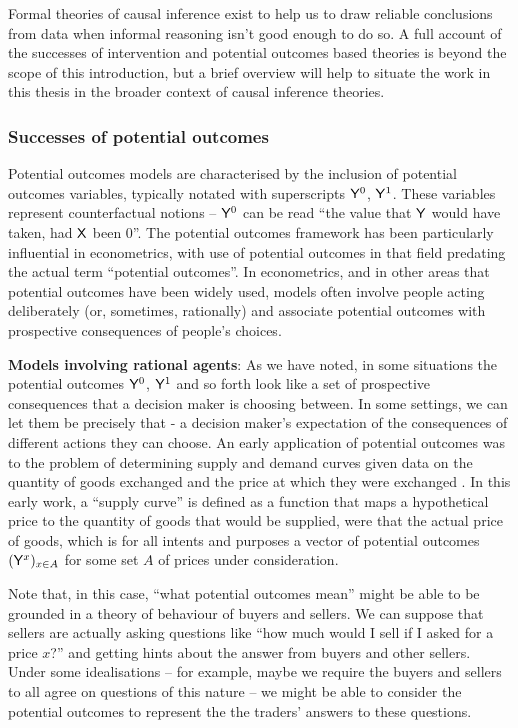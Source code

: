 Formal theories of causal inference exist to help us to draw reliable conclusions from data when informal reasoning isn't good enough to do so. A full account of the successes of intervention and potential outcomes based theories is beyond the scope of this introduction, but a brief overview will help to situate the work in this thesis in the broader context of causal inference theories.

\subsubsection{Successes of potential outcomes}

Potential outcomes models are characterised by the inclusion of potential outcomes variables, typically notated with superscripts $\mathsf{Y}^0$, $\mathsf{Y}^1$. These variables represent counterfactual notions -- $\mathsf{Y}^0$ can be read ``the value that $\mathsf{Y}$ would have taken, had $\mathsf{X}$ been 0''. The potential outcomes framework has been particularly influential in econometrics, with use of potential outcomes in that field predating the actual term ``potential outcomes''. In econometrics, and in other areas that potential outcomes have been widely used, models often involve people acting deliberately (or, sometimes, rationally) and associate potential outcomes with prospective consequences of people's choices.

\textbf{Models involving rational agents}: As we have noted, in some situations the potential outcomes $\mathsf{Y}^0$, $\mathsf{Y}^1$ and so forth look like a set of prospective consequences that a decision maker is choosing between. In some settings, we can let them be precisely that - a decision maker's expectation of the consequences of different actions they can choose. An early application of potential outcomes was to the problem of determining supply and demand curves given data on the quantity of goods exchanged and the price at which they were exchanged \citep{tinbergen1997determination,haavelmo_statistical_1943}. In this early work, a ``supply curve'' is defined as a function that maps a hypothetical price to the quantity of goods that would be supplied, were that the actual price of goods, which is for all intents and purposes a vector of potential outcomes $(\mathsf{Y}^x)_{x\in A}$ for some set $A$ of prices under consideration. 

Note that, in this case, ``what potential outcomes mean'' might be able to be grounded in a theory of behaviour of buyers and sellers. We can suppose that sellers are actually asking questions like ``how much would I sell if I asked for a price $x$?'' and getting hints about the answer from buyers and other sellers. Under some idealisations -- for example, maybe we require the buyers and sellers to all agree on questions of this nature -- we might be able to consider the potential outcomes to represent the the traders' answers to these questions.

